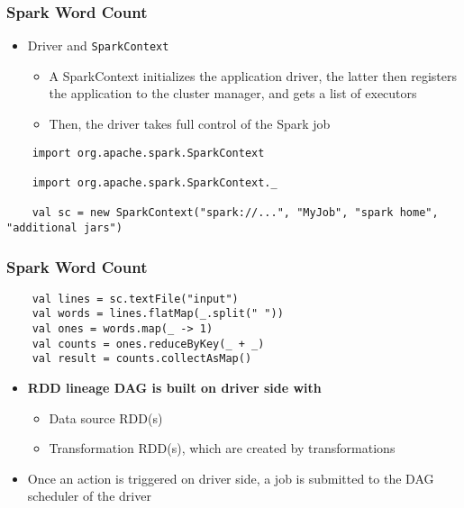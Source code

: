 \begin{frame}[fragile] 
\frametitle{Spark Word Count}

\begin{itemize}
	\item Driver and \texttt{SparkContext}
	\begin{itemize}
		\item A SparkContext initializes the application driver, the latter then registers the application to the cluster manager, and gets a list of executors
		\item Then, the driver takes full control of the Spark job
	\end{itemize}
\end{itemize}

\begin{lstlisting}
	import org.apache.spark.SparkContext

	import org.apache.spark.SparkContext._

	val sc = new SparkContext("spark://...", "MyJob", "spark home", "additional jars") 
\end{lstlisting}

\end{frame}

\begin{frame}[fragile] 
\frametitle{Spark Word Count}
\begin{lstlisting}
	val lines = sc.textFile("input")
	val words = lines.flatMap(_.split(" ")) 
	val ones = words.map(_ -> 1)
	val counts = ones.reduceByKey(_ + _) 
	val result = counts.collectAsMap()
\end{lstlisting}

\begin{itemize}
	\item {\bf RDD lineage DAG is built on driver side with}
	\begin{itemize}
		\item Data source RDD(s)
		\item Transformation RDD(s), which are created by transformations
	\end{itemize}

	\vspace{10pt}

	\item Once an action is triggered on driver side, a job is submitted to the DAG scheduler of the driver
\end{itemize}

\end{frame}

